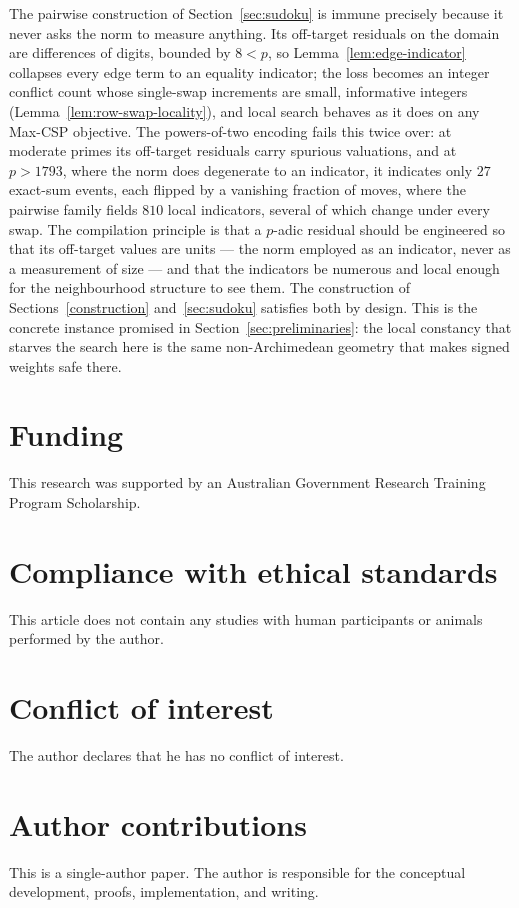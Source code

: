\documentclass[11pt]{article}
\begin{document}
The pairwise construction of Section~\ref{sec:sudoku} is immune precisely because it never
asks the norm to measure anything. Its off-target residuals on the domain
are differences of digits, bounded by $8 < p$, so
Lemma~\ref{lem:edge-indicator} collapses every
edge term to an equality indicator; the loss becomes an integer conflict
count whose single-swap increments are small, informative integers
(Lemma~\ref{lem:row-swap-locality}), and local search behaves as it does on
any Max-CSP objective.
The powers-of-two encoding fails this twice over: at moderate primes its
off-target residuals carry spurious valuations, and at $p > 1793$, where
the norm does degenerate to an indicator, it indicates only $27$ exact-sum
events, each flipped by a vanishing fraction of moves, where the pairwise
family fields $810$ local indicators, several of which change under every
swap. The compilation principle is that a $p$-adic residual should be
engineered so that its off-target values are units --- the norm employed as
an indicator, never as a measurement of size --- and that the indicators be
numerous and local enough for the neighbourhood structure to see them. The
construction of Sections~\ref{construction} and~\ref{sec:sudoku} satisfies
both by design. This is the concrete instance promised in
Section~\ref{sec:preliminaries}: the local constancy that starves the search
here is the same non-Archimedean geometry that makes signed weights safe
there.



\section*{Funding}
This research was supported by an Australian Government Research Training Program Scholarship.

\section*{Compliance with ethical standards}
This article does not contain any studies with human participants or animals performed by the author.

\section*{Conflict of interest}
The author declares that he has no conflict of interest.

\section*{Author contributions}
This is a single-author paper. The author is responsible for the conceptual development, proofs, implementation, and writing.
\end{document}
